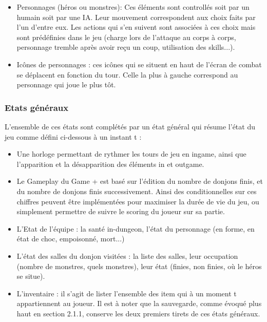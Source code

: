 \documentclass[a4paper,12pt]{article}
\begin{document}
\begin{itemize}
\item Personnages (héros ou monstres): Ces éléments sont controllés soit par un humain soit par une IA. Leur mouvement correspondent aux choix faits par l'un d'entre eux. Les actions qui s'en suivent sont associées à ces choix mais sont prédéfinies dans le jeu (charge lors de l'attaque au corps à corps, personnage tremble après avoir reçu un coup, utilisation des skills...).
\item Icônes de personnages : ces icônes qui se situent en haut de l'écran de combat se déplacent en fonction du tour. Celle la plus à gauche correspond au personnage qui joue le plus tôt.
\end{itemize}
\newpage
\subsubsection{Etats généraux}
L'ensemble de ces états sont complétés par un état général qui résume l'état du jeu comme défini ci-dessous à un instant t : 
\begin{itemize}
    \item Une horloge permettant de rythmer les tours de jeu en ingame, ainsi que l'apparition et la désapparition des éléments in et outgame. 
    \item Le Gameplay du Game + est basé sur l'édition du nombre de donjons finis,
et du nombre de donjons finis successivement. Ainsi des conditionnelles sur ces chiffres peuvent être implémentées pour maximiser la durée de vie du jeu, ou simplement permettre de suivre le scoring du joueur sur sa partie. 
    \item L'Etat de l'équipe : la santé in-dungeon, l'état du personnage (en forme, en état de choc, empoisonné, mort...)
    \item L'état des salles du donjon visitées : la liste des salles, leur occupation (nombre de monstres, quels monstres), leur état (finies, non finies, où le héros se situe).
    \item L'inventaire : il s'agit de lister l'ensemble des item qui à un moment t appartiennent au joueur. 
Il est à noter que la sauvegarde, comme évoqué plus haut en section 2.1.1, conserve les deux premiers tirets de ces états généraux. 
\end{itemize}
\end{document}
